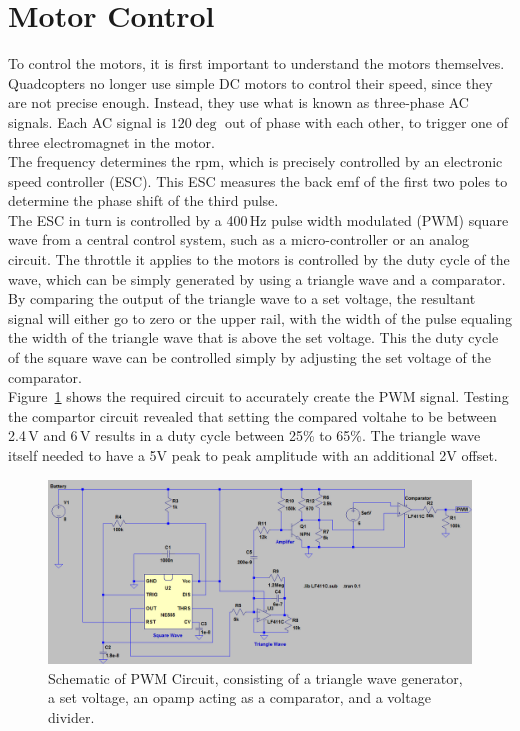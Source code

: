 \documentclass[11pt]{article} %
\begin{document}
\section{Motor Control}
To control the motors, it is first important to understand the motors themselves. Quadcopters no longer use simple DC motors to control their speed, since they are not precise enough. Instead, they use what is known as three-phase AC signals. Each AC signal is $120\deg$ out of phase with each other, to trigger one of three electromagnet in the motor.\\
The frequency determines the rpm, which is precisely controlled by an electronic speed controller (ESC). This ESC measures the back emf of the first two poles to determine the phase shift of the third pulse.\\
The ESC in turn is controlled by a 400\,Hz pulse width modulated (PWM) square wave from a central control system, such as a micro-controller or an analog circuit. The throttle it applies to the motors is controlled by the duty cycle of the wave, which can be simply generated by using a triangle wave and a comparator.\\
By comparing the output of the triangle wave to a set voltage, the resultant signal will either go to zero or the upper rail, with the width of the pulse equaling the width of the triangle wave that is above the set voltage. This the duty cycle of the square wave can be controlled simply by adjusting the set voltage of the comparator.\\
Figure~\ref{fig:PWM} shows the required circuit to accurately create the PWM signal. Testing the compartor circuit revealed that setting the compared voltahe to be between 2.4\,V and 6\,V results in a duty cycle between 25\% to 65\%. The triangle wave itself needed to have a 5V peak to peak amplitude with an additional 2V offset.
\begin{figure}[h]
	\centering
	\includegraphics[width=\textwidth]{MotorControl}
	\caption{Schematic of PWM Circuit, consisting of a triangle wave generator, a set voltage, an opamp acting as a comparator, and a voltage divider.}
	\label{fig:PWM}
\end{figure}
\end{document}
